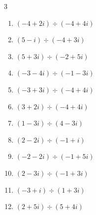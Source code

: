 \begin{multicols}{3}
\begin{enumerate}
  \item $\displaystyle (-4+2i)\div(-4+4i)$


  \item $\displaystyle (5-i)\div(-4+3i)$


  \item $\displaystyle (5+3i)\div(-2+5i)$


\columnbreak %

  \item $\displaystyle (-3-4i)\div(-1-3i)$


  \item $\displaystyle (-3+3i)\div(-4+4i)$


  \item $\displaystyle (3+2i)\div(-4+4i)$


  \item $\displaystyle (1-3i)\div(4-3i)$


  \item $\displaystyle (2-2i)\div(-1+i)$

        \phantom{$\displaystyle =-2$}

  \item $\displaystyle (-2-2i)\div(-1+5i)$


  \item $\displaystyle (2-3i)\div(-1+3i)$


  \item $\displaystyle (-3+i)\div(1+3i)$

        \phantom{$\displaystyle =i$}

  \item $\displaystyle (2+5i)\div(5+4i)$


\end{enumerate}
\end{multicols}
